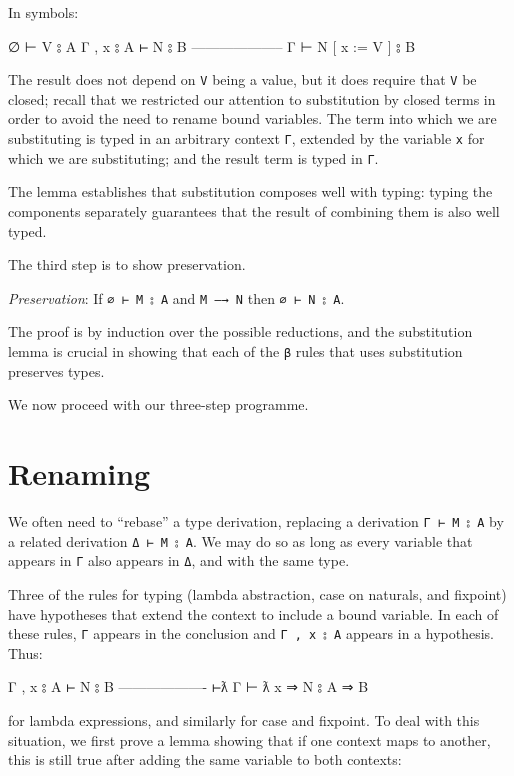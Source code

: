In symbols:

\begin{myDisplay}
∅ ⊢ V ⦂ A
Γ , x ⦂ A ⊢ N ⦂ B
--------------------
Γ ⊢ N [ x := V ] ⦂ B
\end{myDisplay}

The result does not depend on \texttt{V} being a value, but it does
require that \texttt{V} be closed; recall that we restricted our
attention to substitution by closed terms in order to avoid the need to
rename bound variables. The term into which we are substituting is typed
in an arbitrary context \texttt{Γ}, extended by the variable \texttt{x}
for which we are substituting; and the result term is typed in
\texttt{Γ}.

The lemma establishes that substitution composes well with typing:
typing the components separately guarantees that the result of combining
them is also well typed.

The third step is to show preservation.

\emph{Preservation}: If \texttt{∅\ ⊢\ M\ ⦂\ A} and \texttt{M\ —→\ N}
then \texttt{∅\ ⊢\ N\ ⦂\ A}.

The proof is by induction over the possible reductions, and the
substitution lemma is crucial in showing that each of the \texttt{β}
rules that uses substitution preserves types.

We now proceed with our three-step programme.

\hypertarget{renaming}{%
\section{Renaming}\label{renaming}}

We often need to ``rebase'' a type derivation, replacing a derivation
\texttt{Γ\ ⊢\ M\ ⦂\ A} by a related derivation \texttt{Δ\ ⊢\ M\ ⦂\ A}.
We may do so as long as every variable that appears in \texttt{Γ} also
appears in \texttt{Δ}, and with the same type.

Three of the rules for typing (lambda abstraction, case on naturals, and
fixpoint) have hypotheses that extend the context to include a bound
variable. In each of these rules, \texttt{Γ} appears in the conclusion
and \texttt{Γ\ ,\ x\ ⦂\ A} appears in a hypothesis. Thus:

\begin{myDisplay}
Γ , x ⦂ A ⊢ N ⦂ B
------------------- ⊢ƛ
Γ ⊢ ƛ x ⇒ N ⦂ A ⇒ B
\end{myDisplay}

for lambda expressions, and similarly for case and fixpoint. To deal
with this situation, we first prove a lemma showing that if one context
maps to another, this is still true after adding the same variable to
both contexts:

